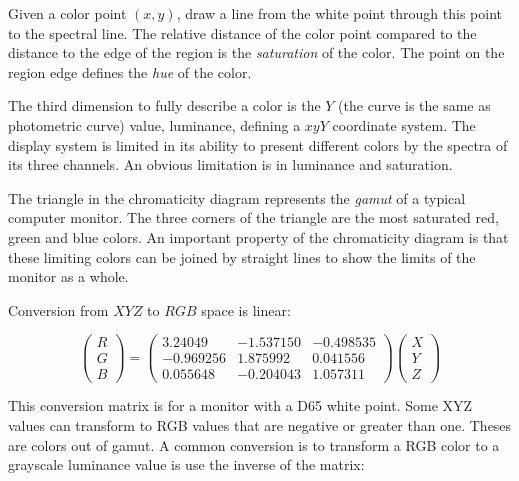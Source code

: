 \documentclass[10pt, a4paper]{article}
\begin{document}
        Given a color point $(x, y)$, draw a line from the white point through this point to the spectral line. The relative distance of the color point compared to the distance to the edge of the region is the \emph{saturation} of the color. The point on the region edge defines the \emph{hue} of the color.

        The third dimension to fully describe a color is the $Y$ (the curve is the same as photometric curve) value, luminance, defining a $xyY$ coordinate system. The display system is limited in its ability to present different colors by the spectra of its three channels. An obvious limitation is in luminance and saturation.

        The triangle in the chromaticity diagram represents the \emph{gamut} of a typical computer monitor. The three corners of the triangle are the most saturated red, green and blue colors. An important property of the chromaticity diagram is that these limiting colors can be joined by straight lines to show the limits of the monitor as a whole. 

        Conversion from $XYZ$ to $RGB$ space is linear: 

        \begin{equation*}
            \begin{pmatrix}
                R \\
                G \\
                B
            \end{pmatrix}
            =
            \begin{pmatrix}
                3.24049 & -1.537150 & -0.498535 \\
                -0.969256 & 1.875992 & 0.041556 \\
                0.055648 & -0.204043 & 1.057311 
            \end{pmatrix}
            \begin{pmatrix}
                X \\
                Y \\
                Z
            \end{pmatrix}
        \end{equation*}
        
        This conversion matrix is for a monitor with a D65 white point. Some XYZ values can transform to RGB values that are negative or greater than one. Theses are colors out of gamut. A common conversion is to transform a RGB color to a grayscale luminance value is use the inverse of the matrix: 
\end{document}
